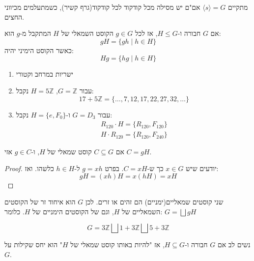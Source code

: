 \documentclass{tstextbook}
\begin{document}
\begin{proposition}
מתקיים \(\langle s\rangle=G\) אם"ם יש מסילה מכל קודקוד לכל קודקוד(גרף קשיר), כשמתעלמים מכיווני החצים.

\end{proposition}
\begin{definition}[קוסט]
אם \(G\) חבורה ו-\(H\leq G\), אז לכל \(g \in G\) הקוסט השמאלי של \(H\) המתקבל מ-\(g\) הוא:
$$gH=\{ gh\;|\; h\in H\}$$
כאשר הקוסט הימיני יהיה:
$$Hg=\{ hg \;|\; h\in H \}$$

\end{definition}
\begin{example}
  \begin{enumerate}
    \item ישריות במרחב וקטורי 


    \item עבור \(G=\mathbb{Z}\), \(H=5\mathbb{Z}\) נקבל: 
$$17+5\mathbb{Z}=\{ \dots,7,12,17,22,27,32,\dots \}$$


    \item עבור \(G=D_{3}\) ו-\(H=\{ e,F_{0} \}\) נקבל: 
$$\begin{gather}R_{120}\cdot H=\{ R_{120}, F_{120} \} \\H\cdot R_{120}=\{ R_{120}, F_{240} \}
\end{gather}$$


  \end{enumerate}
\end{example}
\begin{corollary}
אם \(C\subseteq G\) קוסט שמאלי של \(H\), ו-\(g \in C\) אזי \(C=gH\).

\end{corollary}
\begin{proof}
יודעים שיש \(x \in G\) כך ש-\(C=xH\). בפרט \(g=xh\) ל-\(h \in H\) כלשהו. ואז:
$$gH=(xh)H=x(hH)=xH$$

\end{proof}
\begin{corollary}
שני קוסטים שמאליים(ימניים) הם זהים או זרים. לכן \(G\) הוא איחוד זר של הקוסטים השמאליים של \(H\), וגם של הקוסטים הימניים של \(H\). כלומר: \(G=\bigsqcup gH\)

\end{corollary}
\begin{example}
$$G=3\mathbb{Z} \bigsqcup 1+3\mathbb{Z}\bigsqcup 5+3\mathbb{Z}$$

\end{example}
\begin{remark}
נשים לב אם \(G\) חבורה ו-\(H\subseteq G\), אז "להיות באותו קוסט שמאלי של \(H\)" הוא יחס שקילות על \(G\).

\end{remark}
\end{document}
